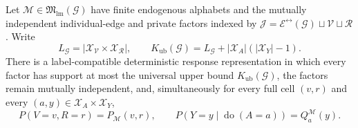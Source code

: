 Let \(\mathcal M\in\mathfrak M_{\mathrm{lm}}(\mathcal G)\) have finite endogenous alphabets and the mutually independent individual-edge and private factors indexed by \(\mathcal J=\mathcal E^{\leftrightarrow}(\mathcal G)\sqcup\mathcal V\sqcup\mathcal R\). Write
\[
L_{\mathcal G}=\left|\mathcal X_{\mathcal V}\times\mathcal X_{\mathcal R}\right|,
\qquad
K_{\mathrm{ub}}(\mathcal G)=L_{\mathcal G}+|\mathcal X_A|(|\mathcal X_Y|-1).
\]
There is a label-compatible deterministic response representation in which every factor has support at most the universal upper bound \(K_{\mathrm{ub}}(\mathcal G)\), the factors remain mutually independent, and, simultaneously for every full cell \((v,r)\) and every \((a,y)\in\mathcal X_A\times\mathcal X_Y\),
\[
P(V=v,R=r)=P_{\mathcal M}(v,r),
\qquad
P(Y=y\mid\operatorname{do}(A=a))=Q_a^{\mathcal M}(y).
\]